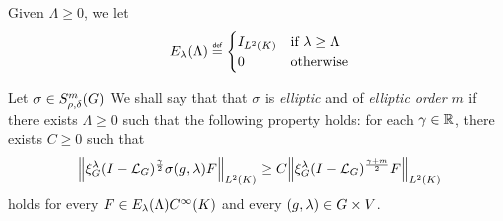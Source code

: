 Given $\Lambda \geq 0$,
we let
\begin{align*}
    E_\lambda(\Lambda)
    \defeq
    \begin{cases}
        \Id {\Lebesgue 2 \CompactGroup} & \text{if } \lambda \geq \Lambda\\
        0 & \text{otherwise}
    \end{cases}
\end{align*}

\begin{definition}[Ellipticity]
\label{definition:ellipticity}
    Let $\sigma \in S^{m}_{\rho, \delta}(G)$
    We shall say that that $\sigma$ is \emph{elliptic} and of \emph{elliptic order} $m$
    if there exists $\Lambda \geq 0$ such that the following property holds:
    for each $\gamma \in \mathbb{R}$,
    there exists $C \geq 0$ such that
    \begin{align}
        \norm [\Lebesgue 2 \CompactGroup] {\Rep \lambda \BesselPotential \gamma \sigma(g, \lambda) F}
        \geq C
        \norm [\Lebesgue 2 \CompactGroup] {\Rep \lambda \BesselPotential {\gamma + m} F}
        \label{eq:definition_of_ellipticity}
    \end{align}
    holds for every $F \in E_\lambda(\Lambda) {C^\infty(K)}$
    and every $(g, \lambda) \in G \times V$.
\end{definition}

